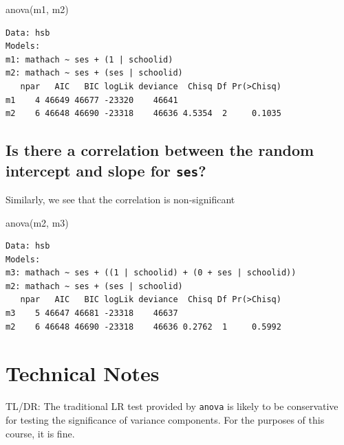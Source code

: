 \documentclass[
  letterpaper,
  DIV=11,
  numbers=noendperiod]{scrreprt}
\newenvironment{Shaded}{\begin{snugshade}}{\end{snugshade}}
\newcommand{\FunctionTok}[1]{\textcolor[rgb]{0.02,0.16,0.49}{#1}}
\newcommand{\NormalTok}[1]{\textcolor[rgb]{0.00,0.44,0.13}{#1}}
\begin{document}
\begin{Shaded}
\begin{Highlighting}[]
\FunctionTok{anova}\NormalTok{(m1, m2)}
\end{Highlighting}
\end{Shaded}

\begin{verbatim}
Data: hsb
Models:
m1: mathach ~ ses + (1 | schoolid)
m2: mathach ~ ses + (ses | schoolid)
   npar   AIC   BIC logLik deviance  Chisq Df Pr(>Chisq)
m1    4 46649 46677 -23320    46641                     
m2    6 46648 46690 -23318    46636 4.5354  2     0.1035
\end{verbatim}

\hypertarget{is-there-a-correlation-between-the-random-intercept-and-slope-for-ses}{%
\subsection{\texorpdfstring{Is there a correlation between the random
intercept and slope for
\texttt{ses}?}{Is there a correlation between the random intercept and slope for ses?}}\label{is-there-a-correlation-between-the-random-intercept-and-slope-for-ses}}

Similarly, we see that the correlation is non-significant

\begin{Shaded}
\begin{Highlighting}[]
\FunctionTok{anova}\NormalTok{(m2, m3)}
\end{Highlighting}
\end{Shaded}

\begin{verbatim}
Data: hsb
Models:
m3: mathach ~ ses + ((1 | schoolid) + (0 + ses | schoolid))
m2: mathach ~ ses + (ses | schoolid)
   npar   AIC   BIC logLik deviance  Chisq Df Pr(>Chisq)
m3    5 46647 46681 -23318    46637                     
m2    6 46648 46690 -23318    46636 0.2762  1     0.5992
\end{verbatim}

\hypertarget{technical-notes}{%
\section{Technical Notes}\label{technical-notes}}

TL/DR: The traditional LR test provided by \texttt{anova} is likely to
be conservative for testing the significance of variance components. For
the purposes of this course, it is fine.
\end{document}
